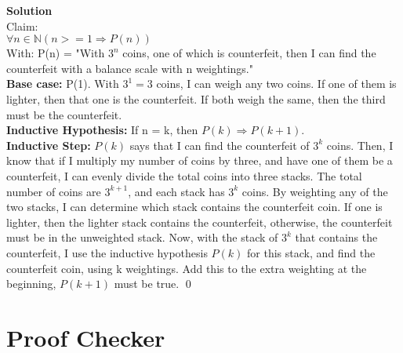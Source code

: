 \documentclass[11pt]{article}
\newcommand*{\Question}[1]{\vfill\pagebreak[3]\section{#1}}
\begin{document}
\begin{mdframed} \textbf{Solution} \\
Claim: \\ 
$\forall n \in \mathbb{N} (n >= 1 \Rightarrow P(n))$ \\
With: P(n) = "With $3^n$ coins, one of which is counterfeit, then I can find the counterfeit with a balance scale with n weightings." \\
\textbf{Base case:} P(1). With $3^1=3$ coins, I can weigh any two coins. If one of them is lighter, then that one is the counterfeit. If both weigh the same, then the third must be the counterfeit. \\
\textbf{Inductive Hypothesis:} If n = k, then $P(k) \Rightarrow P(k+1)$. \\
\textbf{Inductive Step:} $P(k)$ says that I can find the counterfeit of $3^k$ coins. Then, I know that if I multiply my number of coins by three, and have one of them be a counterfeit, I can evenly divide the total coins into three stacks. The total number of coins are $3^{k+1}$, and each stack has $3^k$ coins. By weighting any of the two stacks, I can determine which stack contains the counterfeit coin. If one is lighter, then the lighter stack contains the counterfeit, otherwise, the counterfeit must be in the unweighted stack. Now, with the stack of $3^k$ that contains the counterfeit, I use the inductive hypothesis $P(k)$ for this stack, and find the counterfeit coin, using k weightings. Add this to the extra weighting at the beginning, $P(k+1)$ must be true. \qed
\end{mdframed}

\Question{Proof Checker}
\end{document}
